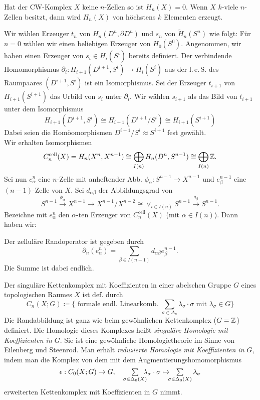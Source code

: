 \documentclass{cheat-sheet}
\newcommand{\nspace}[1]{\foreach \i in {1,...,#1}{ \! }} %
\newcommand{\RH}{\tilde{H}} %
\newcommand{\cell}{\text{cell}} %
\newcommand{\leS}{l.\,e.\,S.} %
\begin{document}
\begin{kor}
  Hat der CW-Komplex $X$ keine $n$-Zellen so ist $H_n(X) = 0$. Wenn $X$ $k$-viele $n$-Zellen besitzt, dann wird $H_n(X)$ von höchstens $k$ Elementen erzeugt.
\end{kor}

\begin{bem}
  Wir wählen Erzeuger $t_n$ von $H_n(D^n, \partial D^n)$ und $s_n$ von $\RH_n(S^n)$ wie folgt:
  Für $n=0$ wählen wir einen beliebigen Erzeuger von $H_0(S^0)$. Angenommen, wir haben einen Erzeuger von $s_i \in H_i(S^i)$ bereits definiert. Der verbindende Homomorphismus $\partial_i : H_{i+1}(D^{i+1}, S^i) \to H_i(S^i)$ aus der \leS{} des Raumpaares $(D^{i+1}, S^i)$ ist ein Isomorphismus. Sei der Erzeuger $t_{i+1}$ von $H_{i+1}(S^{i+1})$ das Urbild von $s_i$ unter $\partial_i$. Wir wählen $s_{i+1}$ als das Bild von $t_{i+1}$ unter dem Isomorphismus
  \[ H_{i+1}(D^{i+1}, S^i) \cong H_{i+1}(D^{i+1}/S^i) \cong H_{i+1}(S^{i+1}) \]
  Dabei seien die Homöomorphismen $D^{i+1}/S^i \approx S^{i+1}$ fest gewählt.\\
  Wir erhalten Isomorphismen
  \[ C^{\cell}_n(X) = H_n(X^n, X^{n-1}) \cong \bigoplus_{I(n)} H_n(D^n, S^{n-1}) \cong \bigoplus_{I(n)} \Z. \]
  Sei nun $e^n_\alpha$ eine $n$-Zelle mit anheftender Abb. $\phi_\alpha : S^{n-1} \to X^{n-1}$ und $e^{n-1}_\beta$ eine $(n{-}1)$-Zelle von $X$. Sei $d_{\alpha \beta}$ der Abbildungsgrad von
  \[ S^{n-1} \xrightarrow{\phi_\alpha} X^{n-1} \to X^{n-1} / X^{n-2} \cong \vee_{i \in I(n)} S^{n-1} \xrightarrow{q_\beta} S^{n-1}. \]
  Bezeichne mit $e^n_\alpha$ den $\alpha$-ten Erzeuger von $C^{\cell}_n(X)$ (mit $\alpha \in I(n)$). Dann haben wir:
\end{bem}

\begin{prop}
  Der zelluläre Randoperator ist gegeben durch
  \[ \partial_n(e^n_\alpha) = \!\!\! \sum_{\beta \in I(n-1)} \!\!\! d_{\alpha \beta} e^{n-1}_\beta. \]
  Die Summe ist dabei endlich.
\end{prop}




\begin{defn}
  Der singuläre Kettenkomplex mit Koeffizienten in einer abelschen Gruppe $G$ eines topologischen Raumes $X$ ist def. durch
  \[ C_n(X; G) \coloneqq \{ \text{ formale endl. Linearkomb. } \sum_{\sigma \in \Delta_n} \lambda_\sigma \cdot \sigma \text{ mit $\lambda_\sigma \in G$} \} \]
  Die Randabbildung ist ganz wie beim gewöhnlichen Kettenkomplex ($G = \mathbb{Z}$) definiert. Die Homologie dieses Komplexes heißt \emph{singuläre Homologie mit Koeffizienten in $G$}. Sie ist eine gewöhnliche Homologietheorie im Sinne von Eilenberg und Steenrod. Man erhält \emph{reduzierte Homologie mit Koeffizienten in $G$}, indem man die Komplex von dem mit dem Augmentierungshomomorphismus
  \[ \epsilon : C_0(X; G) \to G, \quad \sum_{\sigma \in \Delta_0(X)} \nspace{4} \lambda_\sigma \cdot \sigma \mapsto \!\!\! \sum_{\sigma \in \Delta_0(X)} \lambda_\sigma \]
  erweiterten Kettenkomplex mit Koeffizienten in $G$ nimmt.
\end{defn}
\end{document}
